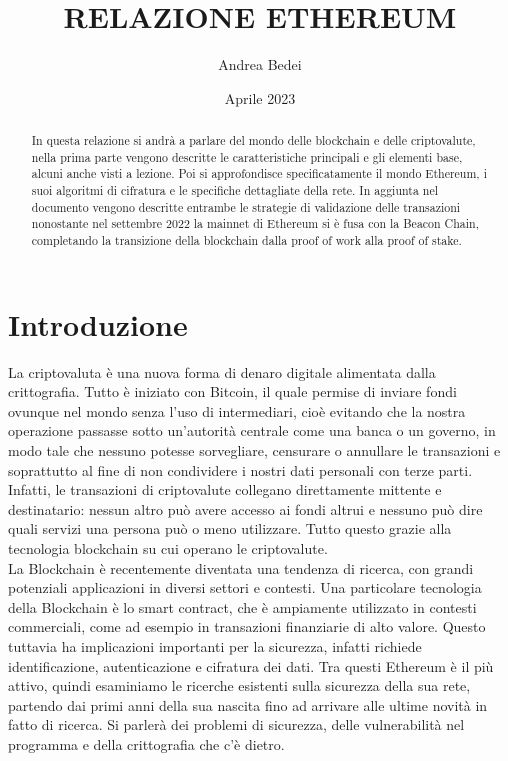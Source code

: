 \documentclass[a4paper,11pt]{report}
\title{\Huge RELAZIONE ETHEREUM}
\author{Andrea Bedei}
\date{Aprile 2023}
\begin{document}
\maketitle
\tableofcontents
\listoffigures

\begin{abstract}%
In questa relazione si andrà a parlare del mondo delle blockchain e delle criptovalute, nella prima parte vengono descritte le caratteristiche principali e gli elementi base, alcuni anche visti a lezione. Poi si approfondisce specificatamente il mondo Ethereum, i suoi algoritmi di cifratura e le specifiche dettagliate della rete. In aggiunta nel documento vengono descritte entrambe le strategie di validazione delle transazioni nonostante nel settembre 2022 la mainnet di Ethereum si è fusa con la Beacon Chain, completando la transizione della blockchain dalla proof of work alla proof of stake.
\end{abstract}

\chapter{Introduzione}
La criptovaluta è una nuova forma di denaro digitale alimentata dalla crittografia. Tutto è iniziato con Bitcoin, il quale permise di inviare fondi ovunque nel mondo senza l'uso di intermediari, cioè evitando che la nostra operazione passasse sotto un'autorità centrale come una banca o un governo, in modo tale che nessuno potesse sorvegliare, censurare o annullare le transazioni e soprattutto al fine di non condividere i nostri dati personali con terze parti.
Infatti, le transazioni di criptovalute collegano direttamente mittente e destinatario: nessun altro può avere accesso ai fondi altrui e nessuno può dire quali servizi una persona può o meno utilizzare. Tutto questo grazie alla tecnologia blockchain su cui operano le criptovalute.\\
La Blockchain è recentemente diventata una tendenza di ricerca, con grandi potenziali applicazioni in diversi settori e contesti. Una particolare tecnologia della Blockchain è lo smart contract, che è ampiamente utilizzato in contesti commerciali, come ad esempio in transazioni finanziarie di alto valore. Questo tuttavia ha implicazioni importanti per la sicurezza, infatti richiede identificazione, autenticazione e cifratura dei dati. Tra questi Ethereum è il più attivo, quindi esaminiamo le ricerche esistenti sulla sicurezza della sua rete, partendo dai primi anni della sua nascita fino ad arrivare alle ultime novità in fatto di ricerca. Si parlerà dei problemi di sicurezza, delle vulnerabilità nel programma e della crittografia che c'è dietro.
\end{document}
